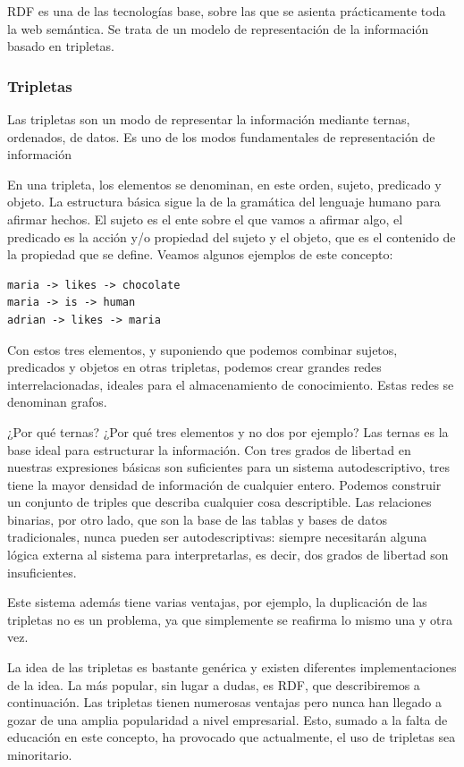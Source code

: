\documentclass[12pt]{report} %
\begin{document}
RDF es una de las tecnologías base, sobre las que se asienta prácticamente toda la web semántica. Se trata de un modelo de representación de la información basado en tripletas.\cite{rdf11}

\subsubsection{Tripletas}
Las tripletas son un modo de representar la información mediante ternas, ordenados, de datos.
Es uno de los modos fundamentales de representación de información

En una tripleta, los elementos se denominan, en este orden, sujeto, predicado y objeto. La estructura básica sigue la de la gramática del lenguaje humano para afirmar hechos.
El sujeto es el ente sobre el que vamos a afirmar algo, el predicado es la acción y/o propiedad del sujeto y el objeto, que es el contenido de la propiedad que se define.
Veamos algunos ejemplos de este concepto:
\begin{verbatim}
maria -> likes -> chocolate
maria -> is -> human
adrian -> likes -> maria
\end{verbatim}
Con estos tres elementos, y suponiendo que podemos combinar sujetos, predicados y objetos en otras tripletas, podemos crear grandes redes interrelacionadas, ideales para el almacenamiento de conocimiento.
Estas redes se denominan grafos.

¿Por qué ternas? ¿Por qué tres elementos y no dos por ejemplo? Las ternas es la base ideal para estructurar la información. Con tres grados de libertad en nuestras expresiones básicas son suficientes para un sistema autodescriptivo, tres tiene la mayor densidad de información de cualquier entero. Podemos construir un conjunto de triples que describa cualquier cosa descriptible. Las relaciones binarias, por otro lado, que son la base de las tablas y bases de datos tradicionales, nunca pueden ser autodescriptivas: siempre necesitarán alguna lógica externa al sistema para interpretarlas, es decir, dos grados de libertad son insuficientes.\cite{rdf}

Este sistema además tiene varias ventajas, por ejemplo, la duplicación de las tripletas no es un problema, ya que simplemente se reafirma lo mismo una y otra vez.

La idea de las tripletas es bastante genérica y existen diferentes implementaciones de la idea. La más popular, sin lugar a dudas, es RDF, que describiremos a continuación.
Las tripletas tienen numerosas ventajas pero nunca han llegado a gozar de una amplia popularidad a nivel empresarial.\cite{stackoverflowsurvey}
Esto, sumado a la falta de educación en este concepto, ha provocado que actualmente, el uso de tripletas sea minoritario.
\end{document}

